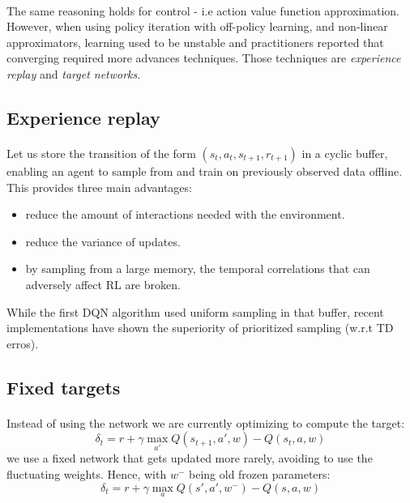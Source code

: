 \documentclass[a4paper]{article}
\begin{document}
{		\paragraph{} The same reasoning holds for control - i.e action value function approximation. However, when using policy iteration with off-policy learning, and non-linear approximators, learning used to be unstable and practitioners reported that converging required more advances techniques. Those techniques are \emph{experience replay} and \emph{target networks}. 
		
		\subsection{Experience replay}
		{
			\paragraph{} Let us store the transition of the form $(s_t,a_t,s_{t+1},r_{t+1})$ in a cyclic buffer, enabling an agent to sample from and train on previously observed data offline. This provides three main advantages: 
			\begin{itemize}
				\item reduce the amount of interactions needed with the environment.
				\item reduce the variance of updates.
				\item by sampling from a large memory, the temporal correlations that can adversely affect RL are broken.
			\end{itemize}
			While the first DQN algorithm used uniform sampling in that buffer, recent implementations have shown the superiority of prioritized sampling (w.r.t TD erros). 
		}
		
		\subsection{Fixed targets}
		{
			\paragraph{} Instead of using the network we are currently optimizing to compute the target:
			\begin{equation}
				\delta_t = r + \gamma \max_{a'} Q(s_{t+1},a',w) - Q(s_t,a,w)
			\end{equation}
			we use a fixed network that gets updated more rarely, avoiding to use the fluctuating weights. Hence, with $w^-$ being old frozen parameters:
			\begin{equation}
				\delta_t = r + \gamma \max_{a}Q(s',a',w^-) - Q(s,a,w)
			\end{equation}
		}
	}
	
\end{document}
